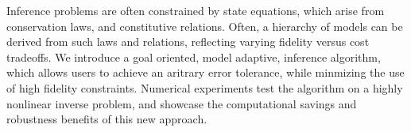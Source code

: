 Inference problems are often constrained by state equations, which arise from conservation laws, and constitutive relations. Often, a hierarchy of models can be derived from such laws and relations, reflecting varying fidelity versus cost tradeoffs. We introduce a goal oriented, model adaptive, inference algorithm, which allows users to achieve an aritrary error tolerance, while minmizing the use of high fidelity constraints. Numerical experiments test the algorithm on a highly nonlinear inverse problem, and showcase the computational savings and robustness benefits of this new approach. 

